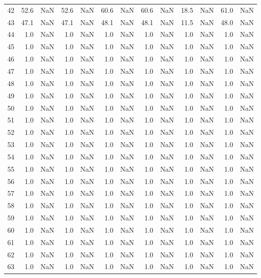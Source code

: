 \begin{tabular}{lrrrrrrrrrrrr}
42 & 52.6 & NaN & 52.6 & NaN & 60.6 & NaN & 60.6 & NaN & 18.5 & NaN & 61.0 & NaN \\
43 & 47.1 & NaN & 47.1 & NaN & 48.1 & NaN & 48.1 & NaN & 11.5 & NaN & 48.0 & NaN \\
44 & 1.0 & NaN & 1.0 & NaN & 1.0 & NaN & 1.0 & NaN & 1.0 & NaN & 1.0 & NaN \\
45 & 1.0 & NaN & 1.0 & NaN & 1.0 & NaN & 1.0 & NaN & 1.0 & NaN & 1.0 & NaN \\
46 & 1.0 & NaN & 1.0 & NaN & 1.0 & NaN & 1.0 & NaN & 1.0 & NaN & 1.0 & NaN \\
47 & 1.0 & NaN & 1.0 & NaN & 1.0 & NaN & 1.0 & NaN & 1.0 & NaN & 1.0 & NaN \\
48 & 1.0 & NaN & 1.0 & NaN & 1.0 & NaN & 1.0 & NaN & 1.0 & NaN & 1.0 & NaN \\
49 & 1.0 & NaN & 1.0 & NaN & 1.0 & NaN & 1.0 & NaN & 1.0 & NaN & 1.0 & NaN \\
50 & 1.0 & NaN & 1.0 & NaN & 1.0 & NaN & 1.0 & NaN & 1.0 & NaN & 1.0 & NaN \\
51 & 1.0 & NaN & 1.0 & NaN & 1.0 & NaN & 1.0 & NaN & 1.0 & NaN & 1.0 & NaN \\
52 & 1.0 & NaN & 1.0 & NaN & 1.0 & NaN & 1.0 & NaN & 1.0 & NaN & 1.0 & NaN \\
53 & 1.0 & NaN & 1.0 & NaN & 1.0 & NaN & 1.0 & NaN & 1.0 & NaN & 1.0 & NaN \\
54 & 1.0 & NaN & 1.0 & NaN & 1.0 & NaN & 1.0 & NaN & 1.0 & NaN & 1.0 & NaN \\
55 & 1.0 & NaN & 1.0 & NaN & 1.0 & NaN & 1.0 & NaN & 1.0 & NaN & 1.0 & NaN \\
56 & 1.0 & NaN & 1.0 & NaN & 1.0 & NaN & 1.0 & NaN & 1.0 & NaN & 1.0 & NaN \\
57 & 1.0 & NaN & 1.0 & NaN & 1.0 & NaN & 1.0 & NaN & 1.0 & NaN & 1.0 & NaN \\
58 & 1.0 & NaN & 1.0 & NaN & 1.0 & NaN & 1.0 & NaN & 1.0 & NaN & 1.0 & NaN \\
59 & 1.0 & NaN & 1.0 & NaN & 1.0 & NaN & 1.0 & NaN & 1.0 & NaN & 1.0 & NaN \\
60 & 1.0 & NaN & 1.0 & NaN & 1.0 & NaN & 1.0 & NaN & 1.0 & NaN & 1.0 & NaN \\
61 & 1.0 & NaN & 1.0 & NaN & 1.0 & NaN & 1.0 & NaN & 1.0 & NaN & 1.0 & NaN \\
62 & 1.0 & NaN & 1.0 & NaN & 1.0 & NaN & 1.0 & NaN & 1.0 & NaN & 1.0 & NaN \\
63 & 1.0 & NaN & 1.0 & NaN & 1.0 & NaN & 1.0 & NaN & 1.0 & NaN & 1.0 & NaN \\

\end{tabular}
